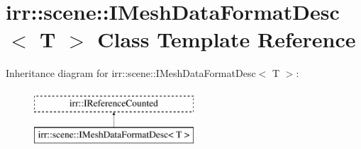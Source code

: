 \hypertarget{classirr_1_1scene_1_1IMeshDataFormatDesc}{}\section{irr\+:\+:scene\+:\+:I\+Mesh\+Data\+Format\+Desc$<$ T $>$ Class Template Reference}
\label{classirr_1_1scene_1_1IMeshDataFormatDesc}
Inheritance diagram for irr\+:\+:scene\+:\+:I\+Mesh\+Data\+Format\+Desc$<$ T $>$\+:\begin{figure}[H]
\begin{center}
\leavevmode
\includegraphics[height=2.000000cm]{classirr_1_1scene_1_1IMeshDataFormatDesc}
\end{center}
\end{figure}
